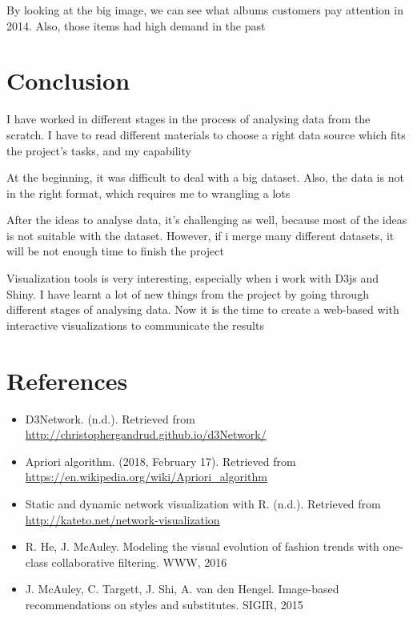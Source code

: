 \documentclass[a4paper,11pt]{article}
\begin{document}
		By looking at the big image, we can see what albums customers pay attention in 2014. Also, those items had high demand in the past

\section{Conclusion}
	I have worked in different stages in the process of analysing data from the scratch. I have to read different materials to choose a right data source which fits the project's tasks, and my capability
	
	At the beginning, it was difficult to deal with a big dataset. Also, the data is not in the right format, which requires me to wrangling a lots
	
	After the ideas to analyse data, it's challenging as well, because most of the ideas is not suitable with the dataset. However, if i merge many different datasets, it will be not enough time to finish the project
	
	Visualization tools is very interesting, especially when i work with D3js and Shiny. I have learnt a lot of new things from the project by going through different stages of analysing data. Now it is the time to create a web-based with interactive visualizations to communicate the results

\section{References}
	\begin{itemize}
		\item D3Network. (n.d.). Retrieved from \url{http://christophergandrud.github.io/d3Network/}
		\item Apriori algorithm. (2018, February 17). Retrieved from \url{https://en.wikipedia.org/wiki/Apriori_algorithm}
		\item Static and dynamic network visualization with R. (n.d.). Retrieved from \url{http://kateto.net/network-visualization}
		\item R. He, J. McAuley. Modeling the visual evolution of fashion trends with one-class collaborative filtering. WWW, 2016
		\item J. McAuley, C. Targett, J. Shi, A. van den Hengel. Image-based recommendations on styles and substitutes. SIGIR, 2015

	\end{itemize}
\end{document}
